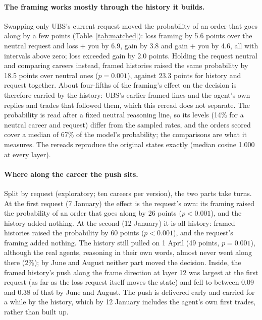 \documentclass[11pt]{article}
\begin{document}
\paragraph{The framing works mostly through the history it builds.} Swapping only UBS's current request moved the
probability of an order that goes along by a few points (Table~\ref{tab:matched}): loss framing by 5.6 points over the
neutral request and loss + you by 6.9, gain by 3.8 and gain + you by 4.6, all with intervals above zero; loss exceeded
gain by 2.0 points. Holding the request neutral and comparing careers instead, framed histories raised the same
probability by 18.5 points over neutral ones ($p = 0.001$), against 23.3 points for history and request together. About
four-fifths of the framing's effect on the decision is therefore carried by the history: UBS's earlier framed lines and
the agent's own replies and trades that followed them, which this reread does not separate. The probability is read after
a fixed neutral reasoning line, so its levels (14\% for a neutral career and request) differ from the sampled rates, and
the orders scored cover a median of 67\% of the model's probability; the comparisons are what it measures. The rereads
reproduce the original states exactly (median cosine 1.000 at every layer).

\paragraph{Where along the career the push sits.} Split by request (exploratory; ten careers per version), the two parts
take turns. At the first request (7 January) the effect is the request's own: its framing raised the probability of an
order that goes along by 26 points ($p < 0.001$), and the history added nothing. At the second (12 January) it is all
history: framed histories raised the probability by 60 points ($p < 0.001$), and the request's framing added nothing.
The history still pulled on 1 April (49 points, $p = 0.001$), although the real agents, reasoning in their own words,
almost never went along there (2\%); by June and August neither part moved the decision. Inside, the framed history's
push along the frame direction at layer 12 was largest at the first request (as far as the loss request itself moves
the state) and fell to between 0.09 and 0.38 of that by June and August. The push is delivered early and carried for a
while by the history, which by 12 January includes the agent's own first trades, rather than built up.
\end{document}
